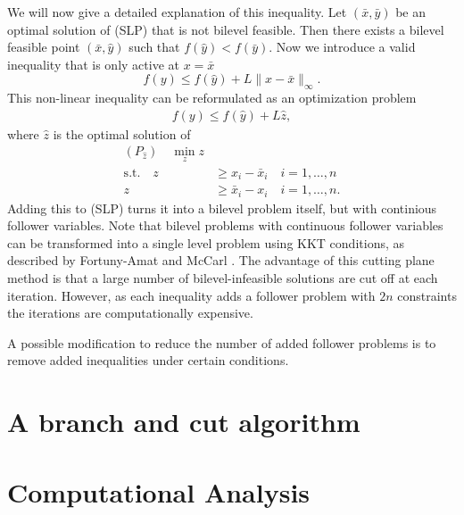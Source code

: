 \documentclass{article}
\begin{document}
We will now give a detailed explanation of this inequality. Let $(\bar x, \bar y)$ be an optimal solution of (SLP) that is not bilevel feasible. Then there exists a bilevel feasible point $(\bar x, \hat y)$ such that $f(\hat y) < f(\bar y)$. Now we introduce a valid inequality that is only active at $x = \bar x$ 
\begin{equation*}
		f(y) \le f(\hat y) + L \|x-\bar x\|_{\infty}.
\end{equation*}
This non-linear inequality can be reformulated as an optimization problem 
\begin{align*}
f(y) \le f(\hat y) + L \hat z, 
\end{align*}
where $\hat z$ is the optimal solution of 
\begin{align*}
(P_{\hat z}) \quad \min_{z} z \\
\text{s.t.} \quad z &\ge x_i - \bar x_i \quad i = 1,\dots,n \\
z &\ge \bar x_i - x_i \quad i = 1,\dots,n.
\end{align*}
Adding this to (SLP) turns it into a bilevel problem itself, but with continious follower variables.
Note that bilevel problems with continuous follower variables can be transformed into a single level problem using KKT conditions, as described by Fortuny-Amat
and McCarl \cite{Fortuny-Amat1981}.
The advantage of this cutting plane method is that a large number of bilevel-infeasible solutions are cut off at each iteration. However, as each inequality adds a follower problem with $2n$ constraints the iterations are computationally expensive.

A possible modification to reduce the number of added follower problems is to remove added inequalities under certain conditions. 

\section{A branch and cut algorithm}


\section{Computational Analysis}


	\newpage
	
	
\end{document}
